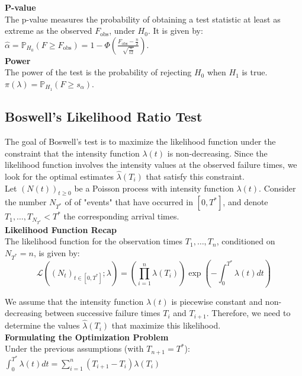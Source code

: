 \documentclass{journalstyle}
\begin{document}
\noindent\textbf{P-value} \\
The p-value measures the probability of obtaining a test statistic at least as extreme as the observed $F_{\text{obs}}$, under $H_0$.
It is given by: \\
$\hat{\alpha} = \mathbb{P}_{H_0}(F \geq F_{\text{obs}}) = 1 - \Phi(\frac{F_{\text{obs}} - \frac{n}{2}}{\sqrt{\frac{n}{12}}})$. \\

\noindent\textbf{Power} \\
The power of the test is the probability of rejecting $H_0$ when $H_1$ is true. \\
$\pi(\lambda) = \mathbb{P}_{H_1}(F \geq s_{\alpha})$.


\subsection{Boswell's Likelihood Ratio Test}

The goal of Boswell's test is to maximize the likelihood function under the constraint that the intensity function $\lambda(t)$ is non-decreasing.
Since the likelihood function involves the intensity values at the observed failure times, we look for the optimal estimates $\hat{\lambda}(T_i)$ that satisfy this constraint. \\

Let $(N(t))_{t \geq 0}$ be a Poisson process with intensity function $\lambda(t)$.
Consider the number $N_{T^*}$ of of "events" that have occurred in $[0, T^*]$, and denote $T_1, \ldots, T_{N_{T^*}} < T^*$ the corresponding arrival times. \\


\noindent\textbf{Likelihood Function Recap} \\
The likelihood function for the observation times $T_1, \ldots, T_n$, conditioned on $N_{T^*} = n$, is given by:
$$
\mathcal{L}((N_t)_{t \in [0, T^*]}; \lambda) = \left(\prod_{i=1}^n \lambda(T_i)\right) \exp\left(-\int_0^{T^*} \lambda(t) dt\right)
$$

We assume that the intensity function $\lambda(t)$ is piecewise constant and non-decreasing between successive failure times $T_{i}$ and $T_{i+1}$.
Therefore, we need to determine the values $\hat{\lambda}(T_i)$ that maximize this likelihood. \\

\noindent\textbf{Formulating the Optimization Problem} \\
Under the previous assumptions (with $T_{n+1} = T^*$): \\
$\int_0^{T^*} \lambda(t) dt = \sum_{i=1}^n (T_{i+1} - T_i) \lambda(T_i)$ \\
\end{document}
